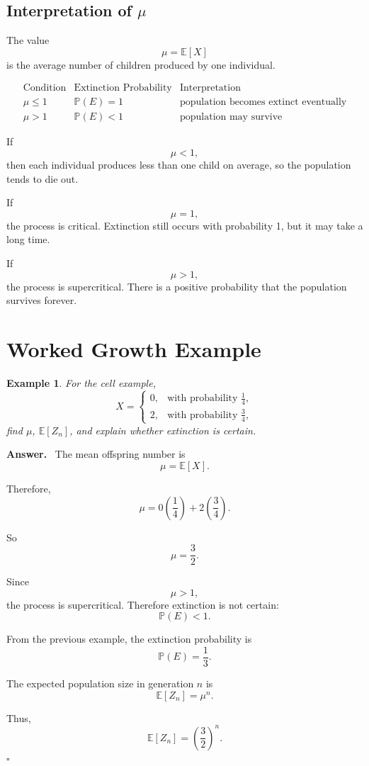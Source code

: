 \documentclass[12pt,a4paper]{article}
\theoremstyle{lecturestyle}
\newtheorem{example}{Example}
\newenvironment{answer}
{\par\textbf{Answer.}\ }
{\hfill$\square$\par}
\newcommand{\Prob}{\mathbb{P}}
\newcommand{\E}{\mathbb{E}}
\begin{document}
\subsection{Interpretation of $\mu$}

The value
\[
\mu=\E[X]
\]
is the average number of children produced by one individual.

\[
\begin{array}{c|c|c}
\text{Condition} & \text{Extinction Probability} & \text{Interpretation}\\
\hline
\mu\leq 1 & \Prob(E)=1 & \text{population becomes extinct eventually}\\
\mu>1 & \Prob(E)<1 & \text{population may survive}
\end{array}
\]

If
\[
\mu<1,
\]
then each individual produces less than one child on average, so the population tends to die out.

If
\[
\mu=1,
\]
the process is critical. Extinction still occurs with probability 1, but it may take a long time.

If
\[
\mu>1,
\]
the process is supercritical. There is a positive probability that the population survives forever.

\section{Worked Growth Example}

\begin{example}
For the cell example,
\[
X=
\begin{cases}
0, & \text{with probability } \frac14,\\
2, & \text{with probability } \frac34,
\end{cases}
\]
find $\mu$, $\E[Z_n]$, and explain whether extinction is certain.
\end{example}

\begin{answer}
The mean offspring number is
\[
\mu=\E[X].
\]

Therefore,
\[
\mu=0\left(\frac14\right)+2\left(\frac34\right).
\]

So
\[
\mu=\frac32.
\]

Since
\[
\mu>1,
\]
the process is supercritical. Therefore extinction is not certain:
\[
\Prob(E)<1.
\]

From the previous example, the extinction probability is
\[
\Prob(E)=\frac13.
\]

The expected population size in generation $n$ is
\[
\E[Z_n]=\mu^n.
\]

Thus,
\[
\boxed{\E[Z_n]=\left(\frac32\right)^n.}
\]
\end{answer}
\end{document}
